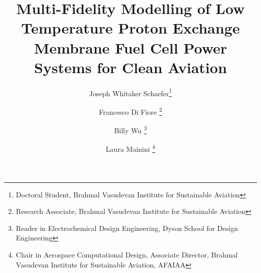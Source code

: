 \title{Multi-Fidelity Modelling of Low Temperature Proton Exchange Membrane Fuel Cell Power Systems for Clean Aviation}

\author{Joseph Whitaker Schaefer\footnote{Doctoral Student, Brahmal Vasudevan Institute for Sustainable Aviation}}
\author{Francesco Di Fiore \footnote{Research Associate, Brahmal Vasudevan Institute for Sustainable Aviation}}
\author{Billy Wu \footnote{ Reader in Electrochemical Design Engineering, Dyson School for Design Engineering}}
\author{Laura Mainini \footnote{Chair in Aerospace Computational Design, Associate Director, Brahmal Vasudevan Institute for Sustainable Aviation, AFAIAA}}

